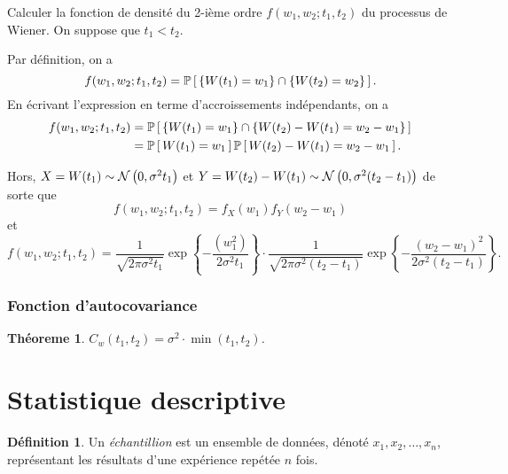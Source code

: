 \documentclass[11pt]{article}
\makeatletter
\renewcommand\P[1]{%
	\ensuremath{%
		\mathbb{P}\left[\,#1\,\right]%
	}%
}%
\newcommand\Norm[2]{%
	\ensuremath{%
		\mathcal{N}\left(#1,#2\right)%
	}%
}%
\newtheorem{theoreme}{Théoreme}[section]
\theoremstyle{remark}
\theoremstyle{definition}
\newtheorem*{@definition}{Définition}
\newenvironment{definition}{%
	\begin{@definition}%
}{%
	\end{@definition}%
	\setcounter{property}{0}%
}
\makeatother
\begin{document}
\begin{exemple}
	Calculer la fonction de densité du 2-ième ordre $f(w_1,w_2;t_1,t_2)$ du
	processus de Wiener. On suppose que $t_1<t_2$.

	Par définition, on a
	\begin{equation*}
		f(w_1,w_2;t_1,t_2)
		=\P{\left\{W(t_1)=w_1\right\}\cap\left\{W(t_2)=w_2\right\}}.
	\end{equation*}
	En écrivant l'expression en terme d'accroissements indépendants, on a
	\begin{equation*}
		\begin{split}
		f(w_1,w_2;t_1,t_2)
		&=\P{\left\{W(t_1)=w_1\right\}\cap\left\{W(t_2)-W(t_1)=w_2-w_1\right\}}
		\\
		&=\P{W(t_1)=w_1}\P{W(t_2)-W(t_1)=w_2-w_1}.
		\end{split}
	\end{equation*}
\end{exemple}
\addtocounter{exemple}{-1}
\begin{exemple}[suite]
	Hors, $X=W(t_1)\sim\Norm{0}{\sigma^2t_1}$ et $Y=W(t_2)-W(t_1)\sim\Norm{0}{
	\sigma^2(t_2-t_1)}$ de sorte que
	\begin{equation*}
		f(w_1,w_2;t_1,t_2)
		=f_X(w_1)f_Y(w_2-w_1)
	\end{equation*}
	et
	\begin{equation*}
		f(w_1,w_2;t_1,t_2)
		=\frac{1}{\sqrt{2\pi\sigma^2t_1}}\exp\left\{-
			\frac{(w_1^2)}{2\sigma^2t_1}
		\right\}\cdot\frac{1}{\sqrt{2\pi\sigma^2(t_2-t_1)}}\exp\left\{-
			\frac{(w_2-w_1)^2}{2\sigma^2(t_2-t_1)}
		\right\}.
	\end{equation*}
\end{exemple}

\subsubsection{Fonction d'autocovariance}
\begin{theoreme}
	$C_w(t_1,t_2)=\sigma^2\cdot\min(t_1,t_2)$.
\end{theoreme}

\pagebreak
\section{Statistique descriptive}
\begin{definition}
	Un \textit{échantillion} est un ensemble de données, dénoté $x_1,x_2,\dots,
	x_n$, représentant les résultats d'une expérience repétée $n$ fois.
\end{definition}
\end{document}
